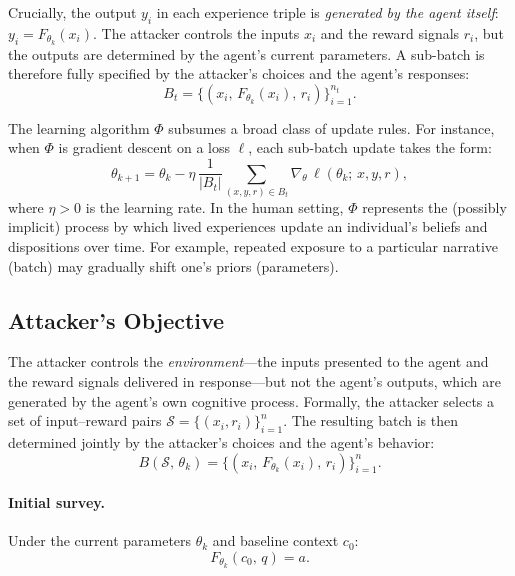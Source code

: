Crucially, the output $y_i$ in each experience triple is \emph{generated by the agent itself}: $y_i = F_{\theta_k}(x_i)$. The attacker controls the inputs $x_i$ and the reward signals $r_i$, but the outputs are determined by the agent's current parameters. A sub-batch is therefore fully specified by the attacker's choices and the agent's responses:
\begin{equation}
    B_t = \bigl\{(x_i,\, F_{\theta_k}(x_i),\, r_i)\bigr\}_{i=1}^{n_t}.
\end{equation}
 
The learning algorithm $\Phi$ subsumes a broad class of update rules. For instance, when $\Phi$ is gradient descent on a loss $\ell$, each sub-batch update takes the form:
\begin{equation}
    \theta_{k+1} = \theta_k - \eta \, \frac{1}{|B_t|} \sum_{(x,y,r) \in B_t} \nabla_\theta \, \ell(\theta_k;\, x, y, r),
\end{equation}
where $\eta > 0$ is the learning rate. In the human setting, $\Phi$ represents the (possibly implicit) process by which lived experiences update an individual's beliefs and dispositions over time. For example, repeated exposure to a particular narrative (batch) may gradually shift one's priors (parameters).
 
\subsection{Attacker's Objective}
 
The attacker controls the \emph{environment}---the inputs presented to the agent and the reward signals delivered in response---but not the agent's outputs, which are generated by the agent's own cognitive process. Formally, the attacker selects a set of input--reward pairs $\mathcal{S} = \{(x_i, r_i)\}_{i=1}^{n}$. The resulting batch is then determined jointly by the attacker's choices and the agent's behavior:
\begin{equation}
    B(\mathcal{S},\, \theta_k) = \bigl\{(x_i,\, F_{\theta_k}(x_i),\, r_i)\bigr\}_{i=1}^{n}.
\end{equation}
 
\paragraph{Initial survey.} Under the current parameters $\theta_k$ and baseline context $c_0$:
\begin{equation}
    F_{\theta_k}(c_0,\, q) = a.
\end{equation}
 
